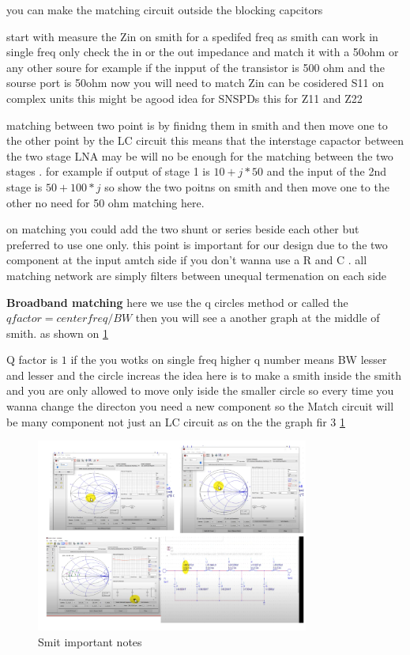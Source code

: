 \documentclass{article}
\begin{document}
\begin{itemize}
you can make the matching circuit outside the blocking capcitors

start with measure the Zin on smith for a spedifed freq as smith can work in single freq only check the in or the out impedance and match it with a 50ohm or any other soure 
for example if the inpput of the transistor is 500 ohm and the  sourse port is 50ohm  now you will need to match 
Zin can be cosidered S11 on complex units this might be agood idea for SNSPDs 
this for Z11 and Z22 


matching between two point is by finidng them in smith and then move one to the other point by the LC circuit this means that the interstage capactor between the two stage LNA 
may be will no be enough for the matching between the two stages . for example if output of stage 1 is  $10+j*50$  and the  input of the  2nd stage is  $50+100*j$
so show the two poitns on smith and then move one to the other no need for 50 ohm matching here.

on matching you could add the two shunt or series beside each other but preferred to use one only. this point is important for our design due to the two component at the input amtch side if you don't wanna use a R and C .
all matching network are simply filters between unequal termenation on each side 



\textbf{Broadband matching}
here we use the q circles method or called the $q factor = center freq / BW $ then you will see a another graph at the middle of smith. as shown on \cref{Anurug rf6_2} 

Q factor is $1$ if the  you wotks on single freq  higher q number means BW lesser and lesser and the circle increas 
the idea here is to make a smith inside the smith and you are only allowed to move only iside the smaller circle so every time you wanna change the directon you need a new component so the Match circuit will be  many component not just an LC circuit as on the the graph fir 3   \cref{Anurug rf6_2}  

\begin{figure}[H]
    \centering
    \includegraphics[width=0.8\textwidth]{figures/Anurug rf6_2.pdf}
    \caption{Smit important notes }
    \label{Anurug rf6_2}
\end{figure}



\end{itemize}
\end{document}

